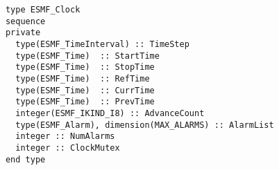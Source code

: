 \begin{verbatim}
      type ESMF_Clock
      sequence
      private
        type(ESMF_TimeInterval) :: TimeStep
        type(ESMF_Time)  :: StartTime
        type(ESMF_Time)  :: StopTime
        type(ESMF_Time)  :: RefTime
        type(ESMF_Time)  :: CurrTime
        type(ESMF_Time)  :: PrevTime
        integer(ESMF_IKIND_I8) :: AdvanceCount
        type(ESMF_Alarm), dimension(MAX_ALARMS) :: AlarmList
        integer :: NumAlarms
        integer :: ClockMutex
      end type
\end{verbatim}
